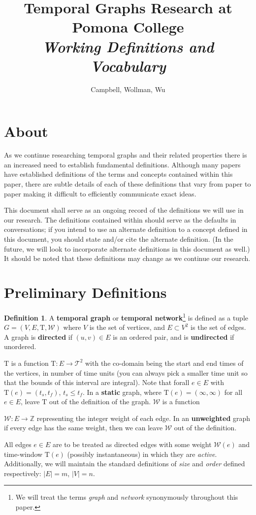 \documentclass{article}
\title{Temporal Graphs Research at Pomona College\\
  \textit{Working Definitions and Vocabulary}
}
\author{Campbell, Wollman, Wu}
\theoremstyle{definition}
\newtheorem{defn}[thm]{Definition}
\numberwithin{thm}{subsection}
\newcommand{\W}{\mathcal{W}}
\newcommand{\Z}{\mathbb{Z}}
\newcommand{\T}{\text{T}}
\newcommand{\TT}{\mathcal{T}}
\begin{document}
\maketitle

\section{About}

As we continue researching temporal graphs and their related properties there is
an increased need to establish fundamental definitions. Although many papers
have established definitions of the terms and concepts contained within this
paper, there are subtle details of each of these definitions that vary from
paper to paper making it difficult to efficiently communicate exact ideas.

This document shall serve as an ongoing record of the definitions we will use
in our research. The definitions contained within should serve as the defaults
in conversations; if you intend to use an alternate definition to a concept
defined in this document, you should state and/or cite the alternate definition.
(In the future, we will look to incorporate alternate definitions in this
document as well.) It should be noted that these definitions may change as we
continue our research.

\section{Preliminary Definitions}

\begin{defn}
  A \textbf{temporal graph} or \textbf{temporal network}\footnote{We will treat
  the terms \textit{graph} and \textit{network} synonymously throughout this
  paper.} is defined as a tuple $G = (V,E,\T,\W)$ where $V$ is the set of
  vertices, and $E \subset V^2$ is the set of edges. A graph is \textbf{directed}
  if $(u,v) \in E$ is an ordered pair, and is \textbf{undirected} if unordered.

  $\T$ is a function $\T : E \to \TT^2$ with the co-domain being the start and
  end times of the vertices, in number of time units (you can always pick a
  smaller time unit so that the bounds of this interval are integral). Note that
  forall $e \in E$ with $\T(e) = (t_s, t_f)$, $t_s \leq t_f$. In a
  \textbf{static} graph, where $\T(e) = (\infty, \infty)$ for all $e \in E$,
  leave $\T$ out of the definition of the graph. $\W$ is a function

  $\W : E \to \Z$ representing the integer weight of each edge. In an
  \textbf{unweighted} graph if every edge has the same weight, then we can
  leave $\W$ out of the definition.

  All edges $e \in E$ are to be treated as directed edges with some weight
  $\W(e)$ and time-window $\T(e)$ (possibly instantaneous) in which they are
  \textit{active}.  Additionally, we will maintain the standard definitions of
  \textit{size} and \textit{order} defined respectively: $|E| = m$, $|V| = n$.
\end{defn}
\end{document}

